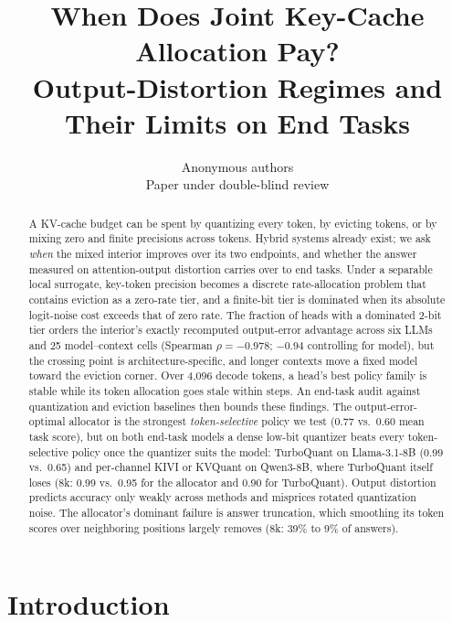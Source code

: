 \documentclass{article}
\title{When Does Joint Key-Cache Allocation Pay?\\
Output-Distortion Regimes and Their Limits on End Tasks}
\author{Anonymous authors \\ Paper under double-blind review}
\theoremstyle{definition}
\begin{document}
\maketitle

\begin{abstract}
A KV-cache budget can be spent by quantizing every token, by evicting tokens, or by mixing zero and finite precisions across tokens.  Hybrid systems already exist; we ask \emph{when} the mixed interior improves over its two endpoints, and whether the answer measured on attention-output distortion carries over to end tasks.  Under a separable local surrogate, key-token precision becomes a discrete rate-allocation problem that contains eviction as a zero-rate tier, and a finite-bit tier is dominated when its absolute logit-noise cost exceeds that of zero rate.  The fraction of heads with a dominated 2-bit tier orders the interior's exactly recomputed output-error advantage across six LLMs and 25 model--context cells (Spearman $\rho=-0.978$; $-0.94$ controlling for model), but the crossing point is architecture-specific, and longer contexts move a fixed model toward the eviction corner.  Over 4,096 decode tokens, a head's best policy family is stable while its token allocation goes stale within steps.  An end-task audit against quantization and eviction baselines then bounds these findings.  The output-error-optimal allocator is the strongest \emph{token-selective} policy we test (0.77 vs.\ 0.60 mean task score), but on both end-task models a dense low-bit quantizer beats every token-selective policy once the quantizer suits the model: TurboQuant on Llama-3.1-8B (0.99 vs.\ 0.65) and per-channel KIVI or KVQuant on Qwen3-8B, where TurboQuant itself loses (8k: 0.99 vs.\ 0.95 for the allocator and 0.90 for TurboQuant).  Output distortion predicts accuracy only weakly across methods and misprices rotated quantization noise.  The allocator's dominant failure is answer truncation, which smoothing its token scores over neighboring positions largely removes (8k: 39\% to 9\% of answers).
\end{abstract}

\section{Introduction}
\label{sec:intro}
\end{document}
